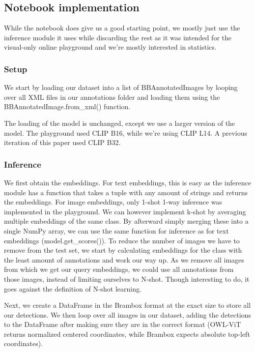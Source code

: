 \subsection{Notebook implementation} \label{sec:3_notebook_implementation}
While the notebook does give us a good starting point, we mostly just use the inference module it uses while discarding the rest as it was intended for the visual-only online playground and we're mostly interested in statistics. 

\subsubsection*{Setup}

We start by loading our dataset into a list of BBAnnotatedImages by looping over all XML files in our annotations folder and loading them using the BBAnnotatedImage.from\_xml() function. 

The loading of the model is unchanged, except we use a larger version of the model. The playground used CLIP B16, while we're using CLIP L14. A previous iteration of this paper used CLIP B32.

\subsubsection*{Inference}

We first obtain the embeddings. For text embeddings, this is easy as the inference module has a function that takes a tuple with any amount of strings and returns the embeddings. For image embeddings, only 1-shot 1-way inference was implemented in the playground. We can however implement k-shot by averaging multiple embeddings of the same class. By afterward simply merging these into a single NumPy array, we can use the same function for inference as for text embeddings (model.get\_scores()). To reduce the number of images we have to remove from the test set, we start by calculating embeddings for the class with the least amount of annotations and work our way up. As we remove all images from which we get our query embeddings, we could use all annotations from those images, instead of limiting ourselves to N-shot. Though interesting to do, it goes against the definition of N-shot learning.

Next, we create a DataFrame in the Brambox format at the exact size to store all our detections. We then loop over all images in our dataset, adding the detections to the DataFrame after making sure they are in the correct format (OWL-ViT returns normalized centered coordinates, while Brambox expects absolute top-left coordinates). 

